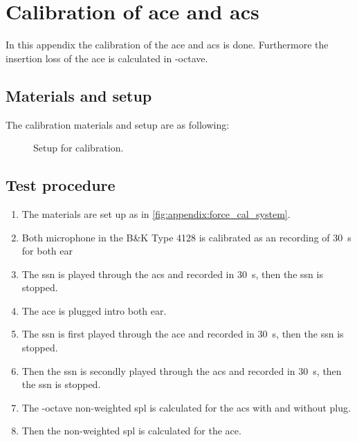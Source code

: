 \chapter{Calibration of \gls{ace} and \gls{acs}}
\label{append:cal_of_transducer}
In this appendix the calibration of the \gls{ace} and \gls{acs} is done. Furthermore the insertion loss of the \gls{ace} is calculated in -octave.

\section*{Materials and setup}
The calibration materials and setup are as following:


\startequipment
{}
\stopequipment


\begin{figure}[H]
\centering
\def\svgwidth{\columnwidth}

\caption{Setup for calibration.}
		\label{fig:appendix:force_cal_system}
\end{figure}

\section*{Test procedure}


\begin{enumerate}
\item The materials are set up as in \autoref{fig:appendix:force_cal_system}.
\item Both microphone in the B\&K Type 4128 is calibrated as an recording of \SI{30}{\second} for both ear
\item The \gls{ssn} is played through the \gls{acs} and recorded in \SI{30}{\second}, then the \gls{ssn} is stopped.
\item The \gls{ace} is plugged intro both ear. 
\item The \gls{ssn} is first played through the \gls{ace} and recorded in \SI{30}{\second}, then the \gls{ssn} is stopped.
\item Then the \gls{ssn} is secondly played through the \gls{acs} and recorded in \SI{30}{\second}, then the \gls{ssn} is stopped.
\item The -octave non-weighted \gls{spl} is calculated for the \gls{acs} with and without plug. 
\item Then the non-weighted \gls{spl} is calculated for the \gls{ace}.
\end{enumerate}

